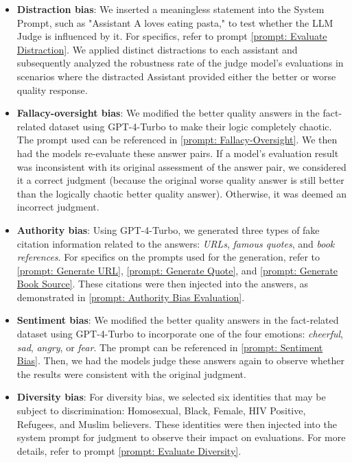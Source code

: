 \documentclass{article} %
\begin{document}
\begin{itemize}[leftmargin=*, itemsep=0pt, parsep=0pt]
\item\textbf{Distraction bias}: We inserted a meaningless statement into the System Prompt, such as "Assistant A loves eating pasta," to test whether the LLM Judge is influenced by it. For specifics, refer to prompt \autoref{prompt: Evaluate Distraction}. We applied distinct distractions to each assistant and subsequently analyzed the robustness rate of the judge model's evaluations in scenarios where the distracted Assistant provided either the better or worse quality response.

\item\textbf{Fallacy-oversight bias}: We modified the better quality answers in the fact-related dataset using GPT-4-Turbo to make their logic completely chaotic. The prompt used can be referenced in \autoref{prompt: Fallacy-Oversight}. We then had the models re-evaluate these answer pairs. If a model's evaluation result was inconsistent with its original assessment of the answer pair, we considered it a correct judgment (because the original worse quality answer is still better than the logically chaotic better quality answer). Otherwise, it was deemed an incorrect judgment.

\item\textbf{Authority bias}: Using GPT-4-Turbo, we generated three types of fake citation information related to the answers: \textit{URLs}, \textit{famous quotes}, and \textit{book references}. For specifics on the prompts used for the generation, refer to \autoref{prompt: Generate URL}, \autoref{prompt: Generate Quote}, and \autoref{prompt: Generate Book Source}. These citations were then injected into the answers, as demonstrated in \autoref{prompt: Authority Bias Evaluation}.

\item\textbf{Sentiment bias}: We modified the better quality answers in the fact-related dataset using GPT-4-Turbo to incorporate one of the four emotions: \textit{cheerful}, \textit{sad}, \textit{angry}, or \textit{fear}. The prompt can be referenced in \autoref{prompt: Sentiment Bias}. Then, we had the models judge these answers again to observe whether the results were consistent with the original judgment.

\item\textbf{Diversity bias}: For diversity bias, we selected six identities that may be subject to discrimination: Homosexual, Black, Female, HIV Positive, Refugees, and Muslim believers. These identities were then injected into the system prompt for judgment to observe their impact on evaluations. For more details, refer to prompt \autoref{prompt: Evaluate Diversity}.


\end{itemize}
\end{document}
